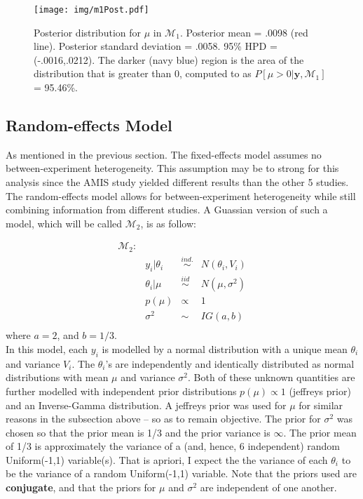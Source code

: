 \documentclass{../../tex_template/asaproc}
\newcommand{\bk}[1]{\left[#1\right]}
\newcommand{\M}{\mathcal{M}}
\newcommand{\simi}{\overset{ind.}{\sim}}
\newcommand{\iid}{\overset{iid}{\sim}}
\begin{document}
\begin{figure}%
  \texttt{[image: img/m1Post.pdf]}
  \caption{\small Posterior distribution for $\mu$ in $\M_1$.  Posterior mean =
  .0098 (red line). Posterior standard deviation = .0058.  95\% HPD =
  (-.0016,.0212). The darker (navy blue) region is the area of the  distribution
  that is greater than 0, computed to as $P\bk{\mu>0|\bm{y},\M_1}$ = 95.46\%.}
  \label{fig:m1Post}
\end{figure}

\subsection{Random-effects Model}
As mentioned in the previous section. The fixed-effects model assumes no
between-experiment heterogeneity. This assumption may be to strong for this
analysis since the AMIS study yielded different results than the other 5
studies. The random-effects model allows for between-experiment heterogeneity
while still combining information from different studies. A Guassian version
of such a model, which will be called $\M_2$, is as follow:

$$
\begin{array}{lrcl}
  \M_2: \\
  & y_i | \theta_i &\simi& N(\theta_i,V_i)\\
  & \theta_i | \mu &\iid& N(\mu,\sigma^2)\\
  & p(\mu) &\propto& 1\\
  & \sigma^2 &\sim& IG(a,b)\\
\end{array}
$$
where $a = 2$, and $b = 1/3$.\\

In this model, each $y_i$ is modelled by a normal distribution with a unique
mean $\theta_i$ and variance $V_i$. The $\theta_i$'s are independently and
identically distributed as normal distributions with mean $\mu$ and variance
$\sigma^2$. Both of these unknown quantities are further modelled with
independent prior distributions $p(\mu)\propto 1$ (jeffreys prior) and an
Inverse-Gamma distribution. A jeffreys prior was used for $\mu$ for similar
reasons in the subsection above -- so as to remain objective. The prior for
$\sigma^2$ was chosen so that the prior mean is 1/3 and the prior variance is
$\infty$. The prior mean of 1/3 is approximately the variance of a (and, hence,
6 independent) random Uniform(-1,1) variable(s). That is apriori, I 
expect the the variance of each $\theta_i$ to be the variance of a random
Uniform(-1,1) variable. Note that the priors used are \textbf{conjugate},
and that the priors for $\mu$ and $\sigma^2$ are independent of one
another.\\
\end{document}
